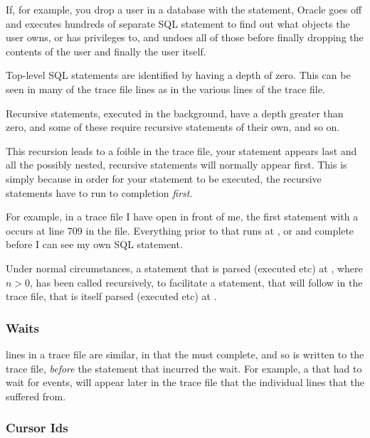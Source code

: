 If, for example, you drop a user in a database with the  statement, Oracle goes off and executes hundreds of separate SQL statement to find out what objects the user owns, or has privileges to, and undoes all of those before finally dropping the contents of the user and finally the user itself.

Top-level SQL statements are identified by having a depth of zero. This can be seen in many of the trace file lines as  in the various lines of the trace file.

Recursive statements, executed in the background, have a depth greater than zero, and some of these require recursive statements of their own, and so on.

This recursion leads to a foible in the trace file, your statement appears last and all the possibly nested, recursive statements will normally appear first. This is simply because in order for your statement to be executed, the recursive statements have to run to completion \emph{first}.

For example, in a trace file I have open in front of me, the first statement with a  occurs at line 709 in the file. Everything prior to that runs at ,  or  and complete before I can see my own SQL statement. 

Under normal circumstances, a statement that is parsed (executed etc) at , where $n > 0$, has been called recursively, to facilitate a statement, that will follow in the trace file, that is itself parsed (executed etc) at .

\subsubsection{Waits}\label{waits}

 lines in a trace file are similar, in that the  must complete, and so is written to the trace file, \emph{before} the statement that incurred the wait. For example, a  that had to wait for  events, will appear later in the trace file that the individual  lines that the  suffered from.

\subsubsection{Cursor Ids}\label{cursor-ids}

